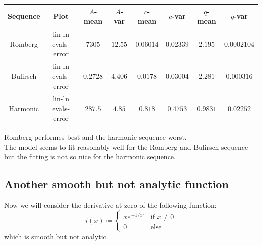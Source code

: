 \begin{table}[H]
    \centering
    \small
    \begin{tabular}{c|c||c|c|c|c|c|c}
Sequence & Plot & \(A\)-mean & \(A\)-var & \(c\)-mean & \(c\)-var & \(q\)-mean & \(q\)-var\\\hline
\rowcolor{green}
Romberg & lin-ln evals-error & \(7305\) & \(12.55\) & \(0.06014\) & \(0.02339\) & \(2.195\) & \(0.0002104\) \\
\rowcolor{green}
Bulirsch & lin-ln evals-error & \(0.2728\) & \(4.406\) & \(0.0178\) & \(0.03004\) & \(2.281\) & \(0.000316\) \\
\rowcolor{red}
Harmonic & lin-ln evals-error & \(287.5\) & \(4.85\) & \(0.818\) & \(0.4753\) & \(0.9831\) & \(0.02252\) \\
    \end{tabular}
    \label{tab:my_label}
\end{table}

Romberg performes best and the harmonic sequence worst.\\

The model seems to fit reasonably well for the Romberg and Bulirsch sequence but the fitting is not so nice for the harmonic sequence.

\subsection{Another smooth but not analytic function}

Now we will consider the derivative at zero of the following function:
\[
i(x)\coloneqq \begin{cases}
xe^{-1/x^2} & \text{if } x \neq 0\\
0 & \text{else}
\end{cases}
\]
which is smooth but not analytic.

